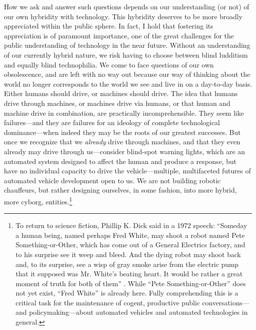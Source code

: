 How we ask and answer such questions depends on our understanding (or
not) of our own hybridity with technology. This hybridity deserves
to be more broadly appreciated within the public sphere. 
In fact, I hold that fostering its appreciation is of paramount
importance, one of the great challenges for the public understanding
of technology in the near future. Without an understanding of our
currently hybrid nature, we risk having to choose between blind ludditism
and equally blind technophilia. We come to face questions of our own
obsolescence, and are left with no way out because our way of thinking
about the world no longer corresponds to the world we see and live in
on a day-to-day basis. Either humans should drive, or machines should
drive. The idea that humans drive through machines, or machines drive
via humans, or that human and machine drive in combination, are
practically incomprehensible. They seem like failures---and they are
failures for an ideology of complete technological dominance---when
indeed they may be the roots of our greatest successes. But once we
recognize that we \emph{already} drive through machines, and that they
even already may drive through us---consider blind-spot
warning lights, which are an automated system designed to affect the
human and produce a response, but have no individual capacity to drive
the vehicle---multiple, multifaceted futures of automated vehicle
development open to us. We are not building robotic
chauffeurs, but rather designing ourselves, in some fashion, into more
hybrid, more cyborg, entities.\footnote{To return to science fiction, Phillip K. Dick said in
a 1972 speech: ``Someday a human being, named perhaps Fred White, may shoot a robot
named Pete Something-or-Other, which has come out of a General
Electrics factory, and to his surprise see it weep and bleed. And the
dying robot may shoot back and, to its surprise, see a wisp of gray
smoke arise from the electric pump that it supposed was Mr. White's
beating heart. It would be rather a great moment of truth for both of
them'' \cite{androidHuman}.
While ``Pete Something-or-Other'' does not yet exist, ``Fred White''
is already here. Fully comprehending this is a critical task for the
maintenance of cogent, productive public conversations---and
policymaking---about automated vehicles and automated technologies in general.}


